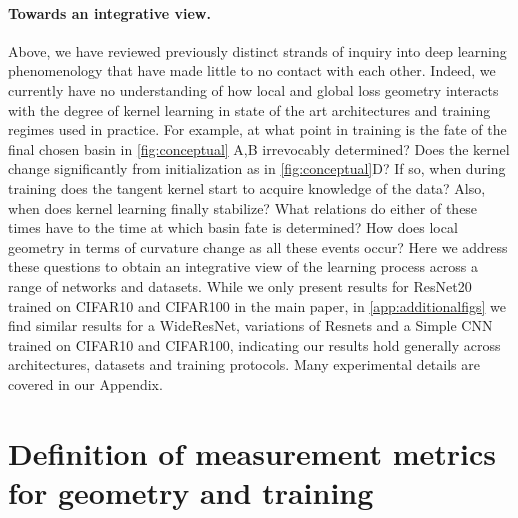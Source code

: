 \documentclass{article}
\begin{document}
\paragraph{Towards an integrative view.} Above, we have reviewed previously distinct strands of inquiry into deep learning phenomenology that have made little to no contact with each other.  
Indeed, we currently have no understanding of how local and global loss geometry interacts with the degree of kernel learning in state of the art architectures and training regimes used in practice.  
For example, at what point in training is the fate of the final chosen basin in \cref{fig:conceptual} A,B irrevocably determined?  
Does the kernel change significantly from initialization as in \cref{fig:conceptual}D?
If so, when during training does the tangent kernel start to acquire knowledge of the data?
Also, when does kernel learning finally stabilize? 
What relations do either of these times have to the time at which basin fate is determined?
How does local geometry in terms of curvature change as all these events occur? Here we address these questions to obtain an integrative view of the learning process across a range of networks and datasets. 
While we only present results for ResNet20 trained on CIFAR10 and CIFAR100 in the main paper, in \cref{app:additionalfigs} we find similar results for a WideResNet, variations of Resnets and a Simple CNN trained on CIFAR10 and CIFAR100, 
indicating our results hold generally across architectures, datasets and training protocols. Many experimental details are covered in our Appendix. 

 

%


\vspace{-0.3cm}
\section{Definition of measurement metrics for geometry and training}
\vspace{-0.3cm}
\label{sec:preliminaries}
\end{document}
